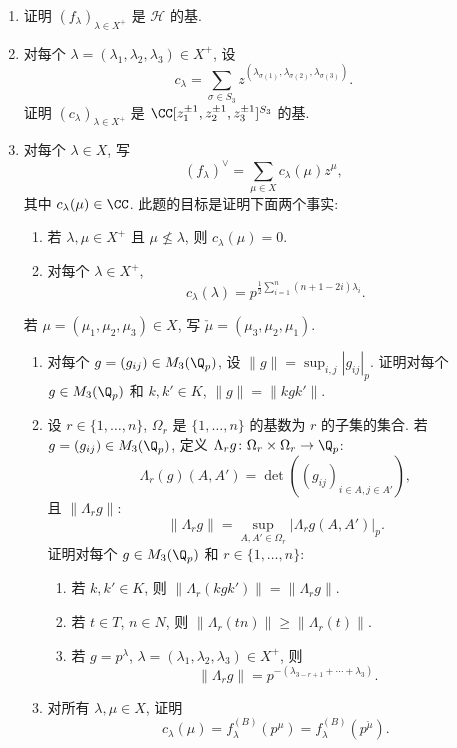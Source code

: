 \begin{enumerate}
\item[(15)] 证明 $(f_{\lambda})_{\lambda \in X^+}$ 是 $\mathcal{H}$ 的基.
\item[(16)] 对每个 $\lambda = (\lambda_1, \lambda_2, \lambda_3) \in X^+$, 设
\[
c_{\lambda} = \sum_{\sigma \in S_3}z^{(\lambda_{\sigma(1)}, \lambda_{\sigma(2)}, \lambda_{\sigma(3)})}.
\]
证明 $(c_{\lambda})_{\lambda \in X^+}$ 是 $\CC[z_1^{\pm 1}, z_2^{\pm 1}, z_3^{\pm 1}]^{S_3}$ 的基.
\item[(17)] 对每个 $\lambda \in X$, 写
\[
(f_{\lambda})^{\vee} = \sum_{\mu \in X}c_{\lambda}(\mu)z^{\mu},
\]
其中 $c_{\lambda}(\mu) \in \CC$. 此题的目标是证明下面两个事实:
\begin{enumerate}
\item[(i)] 若 $\lambda, \mu \in X^+$ 且 $\mu \nleq \lambda$, 则 $c_{\lambda}(\mu) = 0$.
\item[(ii)] 对每个 $\lambda \in X^+$,
\[
c_{\lambda}(\lambda) = p^{\frac{1}{2}\sum_{i=1}^n(n+1-2i)\lambda_i}.
\]
\end{enumerate}
若 $\mu = (\mu_1, \mu_2, \mu_3) \in X$, 写 $\check{\mu} = (\mu_3, \mu_2, \mu_1)$.
\begin{enumerate}
\item[(a)] 对每个 $g = (g_{ij}) \in M_3(\Q_p)$, 设 $\|g\| = \sup_{i,j}|g_{ij}|_p$. 证明对每个 $g \in M_3(\Q_p)$ 和 $k, k' \in K$, $\|g\| = \|kgk'\|$.
\item[(b)] 设 $r \in \{1, \ldots, n\}$, $\Omega_r$ 是 $\{1, \ldots, n\}$ 的基数为 $r$ 的子集的集合. 若 $g = (g_{ij}) \in M_3(\Q_p)$, 定义 $\Lambda_rg \colon \Omega_r \times \Omega_r \to \Q_p$:
\[
\Lambda_r(g)(A, A') = \det((g_{ij})_{i \in A, j \in A'}),
\]
且 $\|\Lambda_rg\|$:
\[
\|\Lambda_rg\| = \sup_{A,A' \in \Omega_r}|\Lambda_rg(A, A')|_p.
\]
证明对每个 $g \in M_3(\Q_p)$ 和 $r \in \{1, \ldots, n\}$:
\begin{enumerate}
\item[$(\alpha)$] 若 $k, k' \in K$, 则 $\|\Lambda_r(kgk')\| = \|\Lambda_rg\|$.
\item[$(\beta)$] 若 $t \in T$, $n \in N$, 则 $\|\Lambda_r(tn)\| \geq \|\Lambda_r(t)\|$.
\item[$(\gamma)$] 若 $g = p^{\lambda}$, $\lambda = (\lambda_1, \lambda_2, \lambda_3) \in X^+$, 则
\[
\|\Lambda_rg\| = p^{-(\lambda_{3-r+1} + \cdots + \lambda_3)}.
\]
\end{enumerate}
\item[(c)] 对所有 $\lambda, \mu \in X$, 证明
\[
c_{\lambda}(\mu) = f_{\lambda}^{(B)}(p^{\mu}) = f_{\lambda}^{(B)}(p^{\check{\mu}}).
\]
\end{enumerate}
\end{enumerate}
